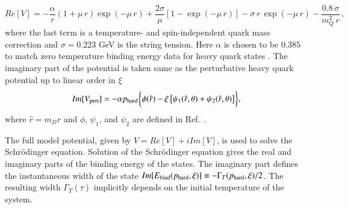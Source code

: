 {{%
\begin{equation} 
\label{eq:repot}
Re[V] = -\frac{\alpha}{r} \left(1+\mu \, r\right) \exp\left( -\mu
\, r  \right) + \frac{2\sigma}{\mu}\left[1-\exp\left( -\mu
\, r  \right)\right] 
 - \sigma \,r\, \exp(-\mu\,r)- \frac{0.8 \, \sigma}{m_Q^2\, r} \, ,
\end{equation}
%
where the last term is a temperature- and spin-independent quark mass correction 
\cite{Bali:1997am} and $\sigma = 0.223$ GeV is the string tension.  Here  $\alpha$ 
is chosen to be  $0.385$ 
to match zero temperature
binding energy data for heavy quark states \cite{Dumitru:2007hy}.
The imaginary part of the potential is taken same as the perturbative heavy quark
potential up to linear order in $\xi$ 
%
\begin{equation} 
Im[V_{\rm pert}] = -\alpha p_{\rm hard} \biggl\{ \phi(\hat{r}) - \xi \left[\psi_1(\hat{r},
\theta)+\psi_2(\hat{r}, \theta)\right]\biggr\} ,
\label{eq:impot}
\end{equation}
%
where $\hat{r}=m_D r$ and $\phi$, $\psi_1$, and $\psi_2$ are defined in Ref.~\cite{Krouppa:2016jcl}. 

 The full model potential, given by $V = Re[V] + i Im[V]$, is used to 
solve the Schr\"odinger equation. 
Solution of the Schr\"odinger equation gives the real and imaginary parts of 
the binding energy of the states.  The imaginary part defines the instantaneous width of the state
$Im[E_{\rm bind}(p_{\rm hard},\xi)] \equiv -\Gamma_T(p_{\rm hard},\xi)/2$. 
The resulting width $\Gamma_T(\tau)$ implicitly depends on the initial temperature of the
system.

}}
